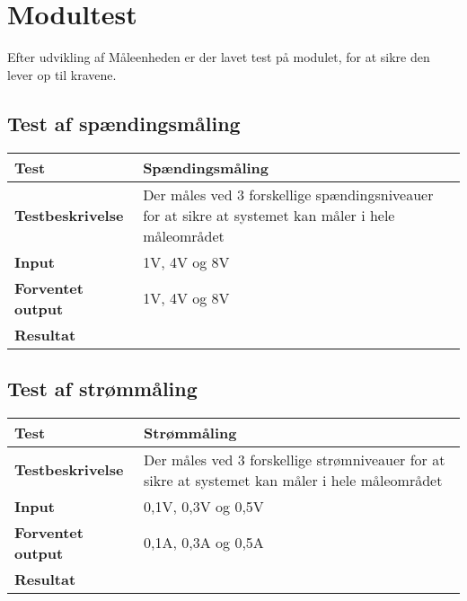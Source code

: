 
\section{Modultest}

Efter udvikling af Måleenheden er der lavet test på modulet, for at sikre den lever op til  kravene.

\subsection*{Test af spændingsmåling}
\begin{center}
	\begin{tabular}{ | m{} | m{}|} 
		\hline
		\textbf{Test}					&Spændingsmåling \\ \hline
		\textbf{Testbeskrivelse}		&Der måles ved 3 forskellige spændingsniveauer for at sikre at systemet kan måler i hele måleområdet  \\ \hline
		\textbf{Input}					&1V, 4V og 8V\\ \hline
		\textbf{Forventet output}		&1V, 4V og 8V\\ \hline
		\textbf{Resultat}				&\\ \hline
	\end{tabular}
\end{center}


\subsection*{Test af strømmåling}
\begin{center}
	\begin{tabular}{ | m{} | m{}|} 
		\hline
		\textbf{Test}					&Strømmåling \\ \hline
		\textbf{Testbeskrivelse}		&Der måles ved 3 forskellige strømniveauer for at sikre at systemet kan måler i hele måleområdet  \\ \hline
		\textbf{Input}					&0,1V, 0,3V og 0,5V\\ \hline
		\textbf{Forventet output}		&0,1A, 0,3A og 0,5A \\ \hline
		\textbf{Resultat}				&\\ \hline
	\end{tabular}
\end{center}


